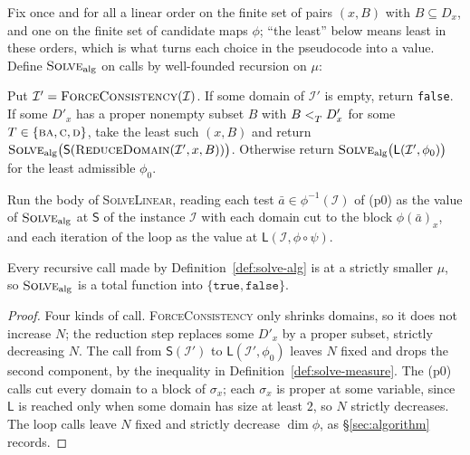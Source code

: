 \begin{definition}\label{def:solve-alg}
Fix once and for all a linear order on the finite set of pairs $(x,B)$ with
$B\subseteq D_{x}$, and one on the finite set of candidate maps $\phi$; ``the
least'' below means least in these orders, which is what turns each choice in
the pseudocode into a value. Define $\textsc{Solve}_{\mathrm{alg}}$ on calls by
well-founded recursion on $\mu$:

\begin{description}\tightlist
\item[$\mathsf S(\mathcal I)$.] Put $\mathcal I'=
  \textsc{ForceConsistency}(\mathcal I)$. If some domain of $\mathcal I'$ is
  empty, return \texttt{false}. If some $D'_{x}$ has a proper nonempty subset
  $B$ with $B<_{T}^{}D'_{x}$ for some $T\in\{\textup{\textsc{ba}},\textup{\textsc{c}},\textup{\textsc{d}}\}$, take the least
  such $(x,B)$ and return
  $\textsc{Solve}_{\mathrm{alg}}\bigl(\mathsf S(\textsc{ReduceDomain}(\mathcal
  I',x,B))\bigr)$. Otherwise return $\textsc{Solve}_{\mathrm{alg}}
  \bigl(\mathsf L(\mathcal I',\phi_{0})\bigr)$ for the least admissible
  $\phi_{0}$.
\item[$\mathsf L(\mathcal I,\phi)$.] Run the body of \textsc{SolveLinear},
  reading each test $\bar a\in\phi^{-1}(\mathcal I)$ of \textup{(p0)} as the
  value of $\textsc{Solve}_{\mathrm{alg}}$ at $\mathsf S$ of the instance
  $\mathcal I$ with each domain cut to the block $\phi(\bar a)_{x}$, and each
  iteration of the loop as the value at $\mathsf L(\mathcal I,\phi\circ\psi)$.
\end{description}
\end{definition}

\begin{lemma}\label{lem:solve-terminates}
Every recursive call made by Definition~\ref{def:solve-alg} is at a strictly
smaller $\mu$, so $\textsc{Solve}_{\mathrm{alg}}$ is a total function into
$\{\texttt{true},\texttt{false}\}$.
\end{lemma}

\begin{proof}
Four kinds of call. \textsc{ForceConsistency} only shrinks domains, so it does
not increase $N$; the reduction step replaces some $D'_{x}$ by a proper subset,
strictly decreasing $N$. The call from $\mathsf S(\mathcal I')$ to
$\mathsf L(\mathcal I',\phi_{0})$ leaves $N$ fixed and drops the second
component, by the inequality in Definition~\ref{def:solve-measure}. The
\textup{(p0)} calls cut every domain to a block of $\sigma_{x}$; each
$\sigma_{x}$ is proper at some variable, since $\mathsf L$ is reached only when
some domain has size at least $2$, so $N$ strictly decreases. The loop calls
leave $N$ fixed and strictly decrease $\dim\phi$, as
\S\ref{sec:algorithm} records.
\end{proof}

